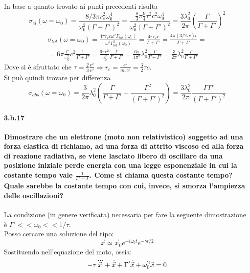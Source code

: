 \documentclass[twoside]{article}
\begin{document}
In base a quanto trovato ai punti precedenti risulta
\begin{equation}
    \sigma_{el}(\omega=\omega_0)=\frac{8/3 \pi r_e^2 \omega_0^4}{\omega_0^2(\Gamma +\Gamma')^2}=\frac{\frac{8}{3}\pi \frac{9}{4} \tau^2 c^2 \omega_0^4 }{\omega_0^2(\Gamma+\Gamma')^2}=\frac{3\lambda_0^2}{2\pi}\left( \frac{\Gamma}{\Gamma+\Gamma'} \right)^2
\end{equation}
\begin{equation}\begin{split}
    \sigma_{tot}(\omega=\omega_0)=\frac{4\pi r_e c \omega^2 \Gamma_{tot}(\omega_0)}{\omega^2 \Gamma_{tot}^2(\omega_0)}=\frac{4\pi r_e c}{\Gamma + \Gamma'}=\frac{4\pi(3/2\tau c)c}{\Gamma+\Gamma'}=\\
    =6\pi \frac{\Gamma}{\omega_0^2}c^2\frac{1}{\Gamma+\Gamma'}=\frac{6\pi c^2}{\omega_0^2}\frac{\Gamma}{\Gamma+\Gamma'}=\frac{6\pi }{4\pi^2}\lambda_0^2\frac{\Gamma}{\Gamma+\Gamma'}=\frac{3}{2\pi}\lambda_0^2\frac{\Gamma}{\Gamma+\Gamma'}
\end{split}\end{equation}
Dove si è sfruttato che $\tau=\frac{2}{3}\frac{e^2}{c^3}\Longrightarrow r_e=\frac{e^2}{m_ec^2}=\frac{3}{2}\tau c$.\\
Si può quindi trovare per differenza
\begin{equation}
    \sigma_{abs}(\omega=\omega_0)=\frac{3}{2\pi}\lambda_0^2\left( \frac{\Gamma}{\Gamma+\Gamma'}-\frac{\Gamma^2}{(\Gamma+\Gamma')^2} \right)=\frac{3 \lambda_0^2}{2\pi}\frac{\Gamma \Gamma'}{(\Gamma +\Gamma')^2}
\end{equation}






\paragraph{3.b.17}\textbf{Dimostrare che un elettrone (moto non relativistico) soggetto ad una forza
elastica di richiamo, ad una forza di attrito viscoso ed alla forza di reazione
radiativa, se viene lasciato libero di oscillare da una posizione iniziale perde
energia con una legge esponenziale in cui la costante tempo vale $\frac{1}{\Gamma' +\Gamma}$. Come si
chiama questa costante tempo? Quale sarebbe la costante tempo con cui, invece,
si smorza l'ampiezza delle oscillazioni?}\\ \\

La condizione (in genere verificata) necessaria per fare la seguente dimostrazione è $\Gamma'<<\omega_0<<1/\tau$.
\\
Posso cercare una soluzione del tipo:
\begin{equation}
    \vec{x}\simeq \vec{x}_0e^{-i\omega_0 t}e^{-\gamma t/2}
\end{equation}
Sostituendo nell'equazione del moto, ossia:
\begin{equation}
    -\tau \dddot{\vec{x}}+\Ddot{\vec{x}}+\Gamma'\dot{\vec{x}}+\omega_0^2\vec{x}=0
\end{equation}
\end{document}
